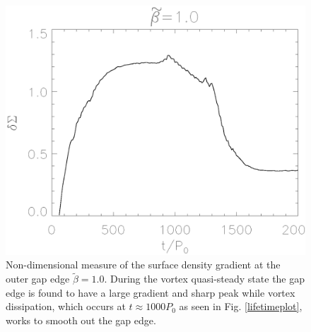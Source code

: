 

\begin{figure}
  \includegraphics[width=\linewidth]{figures/gap_smoothness}
  \caption{Non-dimensional measure of the surface density gradient at
    the outer gap edge $\tilde\beta=1.0$. During the vortex quasi-steady state
    the gap edge is found to have a large gradient and sharp peak while vortex
    dissipation,
    which occurs at $t\approx1000P_0$ as seen in Fig. \ref{lifetimeplot},
    works to smooth out the gap edge.
    \label{smoothnessplot}}  
\end{figure}




